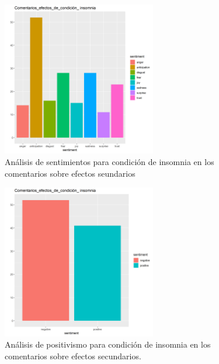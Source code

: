 \documentclass[spanish,]{article}
\begin{document}
\begin{figure}[h]
    \centering
    \includegraphics[width=0.6\textwidth]{figuras/sentimientos/Binsomnia1.png}
    \caption{Análisis de sentimientos para condición de insomnia en los comentarios sobre efectos seundarios}
    \label{fig:sentimientos:23}
\end{figure}

\begin{figure}[h]
    \centering
    \includegraphics[width=0.6\textwidth]{figuras/sentimientos/Binsomnia2.png}
    \caption{Análisis de positivismo para condición de insomnia en los comentarios sobre efectos secundarios.}
    \label{fig:sentimientos:24}
\end{figure}
\end{document}
